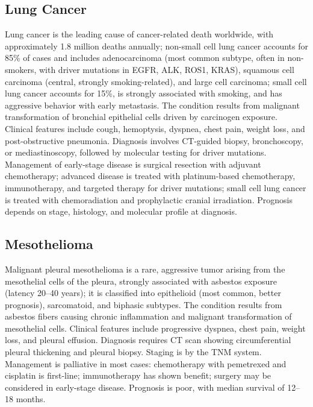 

\label{sec:Lung Neoplasms}

\subsection{Lung Cancer}
\label{sec:Lung Cancer}
Lung cancer is the leading cause of cancer-related death worldwide, with approximately 1.8 million deaths annually; non-small cell lung cancer accounts for 85\% of cases and includes adenocarcinoma (most common subtype, often in non-smokers, with driver mutations in EGFR, ALK, ROS1, KRAS), squamous cell carcinoma (central, strongly smoking-related), and large cell carcinoma; small cell lung cancer accounts for 15\%, is strongly associated with smoking, and has aggressive behavior with early metastasis. The condition results from malignant transformation of bronchial epithelial cells driven by carcinogen exposure. Clinical features include cough, hemoptysis, dyspnea, chest pain, weight loss, and post-obstructive pneumonia. Diagnosis involves CT-guided biopsy, bronchoscopy, or mediastinoscopy, followed by molecular testing for driver mutations. Management of early-stage disease is surgical resection with adjuvant chemotherapy; advanced disease is treated with platinum-based chemotherapy, immunotherapy, and targeted therapy for driver mutations; small cell lung cancer is treated with chemoradiation and prophylactic cranial irradiation. Prognosis depends on stage, histology, and molecular profile at diagnosis.

\subsection{Mesothelioma}
\label{sec:Mesothelioma}
Malignant pleural mesothelioma is a rare, aggressive tumor arising from the mesothelial cells of the pleura, strongly associated with asbestos exposure (latency 20--40 years); it is classified into epithelioid (most common, better prognosis), sarcomatoid, and biphasic subtypes. The condition results from asbestos fibers causing chronic inflammation and malignant transformation of mesothelial cells. Clinical features include progressive dyspnea, chest pain, weight loss, and pleural effusion. Diagnosis requires CT scan showing circumferential pleural thickening and pleural biopsy. Staging is by the TNM system. Management is palliative in most cases: chemotherapy with pemetrexed and cisplatin is first-line; immunotherapy has shown benefit; surgery may be considered in early-stage disease. Prognosis is poor, with median survival of 12--18 months.

